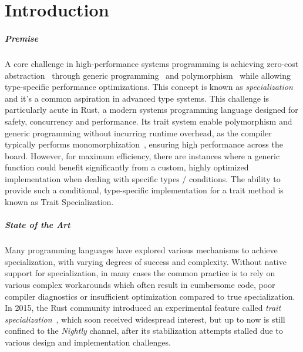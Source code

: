 \chapter{Introduction}\label{chap:introduction}

\paragraph{Premise}
A core challenge in high-performance systems programming is achieving zero-cost abstraction~\cite{Steele90,Stroustrup05} through generic programming~\cite{Musser89,Backhouse99} and polymorphism~\cite{Cardelli85,Wadler90} while allowing type-specific performance optimizations.
This concept is known as \textit{specialization} and it's a common aspiration in advanced type systems.
This challenge is particularly acute in Rust, a modern systems programming language designed for safety, concurrency and performance.
Its trait system enable polymorphism and generic programming without incurring runtime overhead, as the compiler typically performs monomorphization~\cite{Griesemer2020FeatherweightG}, ensuring high performance across the board.
However, for maximum efficiency, there are instances where a generic function could benefit significantly from a custom, highly optimized implementation when dealing with specific types / conditions.
The ability to provide such a conditional, type-specific implementation for a trait method is known as Trait Specialization.

\paragraph{State of the Art}
Many programming languages have explored various mechanisms to achieve specialization, with varying degrees of success and complexity.
Without native support for specialization, in many cases the common practice is to rely on various complex workarounds which often result in cumbersome code, poor compiler diagnostics or insufficient optimization compared to true specialization.
In 2015, the Rust community introduced an experimental feature called \textit{trait specialization}~\cite{SpecializationRFC}, which soon received widespread interest, but up to now is still confined to the \textit{Nightly} channel, after its stabilization attempts stalled due to various design and implementation challenges.

